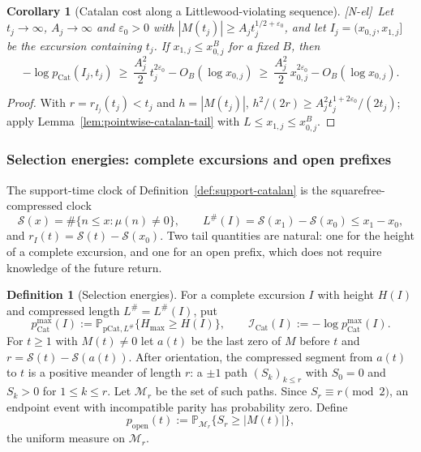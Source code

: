 \documentclass[11pt]{amsart}
\numberwithin{equation}{section}
\theoremstyle{plain}
\newtheorem{corollary}[theorem]{Corollary}
\theoremstyle{definition}
\newtheorem{definition}[theorem]{Definition}
\theoremstyle{remark}
\newcommand{\eps}{\varepsilon}
\newcommand{\Sq}{\mathcal{S}}
\newcommand{\tagNE}{\textup{[N-el]}}
\begin{document}
\begin{corollary}[Catalan cost along a Littlewood-violating sequence]
\label{cor:catalan-sequence}
\tagNE\ Let $t_j\to\infty$, $A_j\to\infty$ and $\eps_0>0$ with
$|M(t_j)|\ge A_jt_j^{1/2+\eps_0}$, and let $I_j=(x_{0,j},x_{1,j}]$ be the
excursion containing $t_j$. If $x_{1,j}\le x_{0,j}^{B}$ for a fixed $B$,
then
\[
-\log p_{\mathrm{Cat}}(I_j,t_j)\ \ge\ \frac{A_j^2}{2}\,t_j^{2\eps_0}
-O_B(\log x_{0,j})\ \ge\ \frac{A_j^2}{2}\,x_{0,j}^{2\eps_0}-O_B(\log x_{0,j}).
\]
\end{corollary}

\begin{proof}
With $r=r_{I_j}(t_j)<t_j$ and $h=|M(t_j)|$,
$h^2/(2r)\ge A_j^2t_j^{1+2\eps_0}/(2t_j)$; apply
Lemma~\ref{lem:pointwise-catalan-tail} with $L\le x_{1,j}\le x_{0,j}^B$.
\end{proof}

\subsubsection*{Selection energies: complete excursions and open prefixes}

The support-time clock of Definition~\ref{def:support-catalan} is the
squarefree-compressed clock
\[
\Sq(x)=\#\{n\le x:\mu(n)\ne0\},\qquad L^\#(I)=\Sq(x_1)-\Sq(x_0)\le x_1-x_0,
\]
and $r_I(t)=\Sq(t)-\Sq(x_0)$. Two tail quantities are natural: one for the
height of a complete excursion, and one for an open prefix, which does not
require knowledge of the future return.

\begin{definition}[Selection energies]
\label{def:selection-energies}
For a complete excursion $I$ with height $H(I)$ and compressed length
$L^\#=L^\#(I)$, put
\[
p^{\max}_{\mathrm{Cat}}(I):=\mathbb P_{\mathrm{pCat},L^\#}\{H_{\max}\ge H(I)\},
\qquad
\mathcal I_{\mathrm{Cat}}(I):=-\log p^{\max}_{\mathrm{Cat}}(I).
\]
For $t\ge1$ with $M(t)\ne0$ let $a(t)$ be the last zero of $M$ before $t$ and
$r=\Sq(t)-\Sq(a(t))$. After orientation, the compressed segment from $a(t)$ to
$t$ is a positive meander of length $r$: a $\pm1$ path $(S_k)_{k\le r}$ with
$S_0=0$ and $S_k>0$ for $1\le k\le r$. Let $\mathcal M_r$ be the set of such
paths.  Since $S_r\equiv r\pmod 2$, an endpoint event with incompatible
parity has probability zero.  Define
\[
p_{\mathrm{open}}(t):=\mathbb P_{\mathcal M_r}\{S_r\ge|M(t)|\},
\]
the uniform measure on $\mathcal M_r$.
\end{definition}
\end{document}
